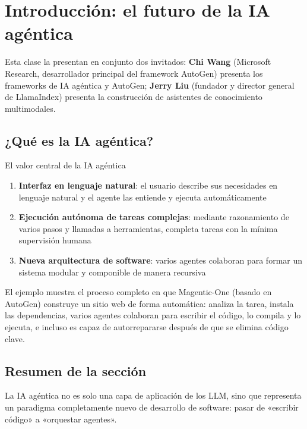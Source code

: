 \section{Introducción: el futuro de la IA agéntica}

Esta clase la presentan en conjunto dos invitados: \textbf{Chi Wang} (Microsoft Research, desarrollador principal del framework AutoGen) presenta los frameworks de IA agéntica y AutoGen; \textbf{Jerry Liu} (fundador y director general de LlamaIndex) presenta la construcción de asistentes de conocimiento multimodales.

\subsection{¿Qué es la IA agéntica?}

\begin{importantbox}{El valor central de la IA agéntica}
\begin{enumerate}
    \item \textbf{Interfaz en lenguaje natural}: el usuario describe sus necesidades en lenguaje natural y el agente las entiende y ejecuta automáticamente
    \item \textbf{Ejecución autónoma de tareas complejas}: mediante razonamiento de varios pasos y llamadas a herramientas, completa tareas con la mínima supervisión humana
    \item \textbf{Nueva arquitectura de software}: varios agentes colaboran para formar un sistema modular y componible de manera recursiva
\end{enumerate}
\end{importantbox}

El ejemplo muestra el proceso completo en que Magentic-One (basado en AutoGen) construye un sitio web de forma automática: analiza la tarea, instala las dependencias, varios agentes colaboran para escribir el código, lo compila y lo ejecuta, e incluso es capaz de autorrepararse después de que se elimina código clave.

\subsection{Resumen de la sección}

La IA agéntica no es solo una capa de aplicación de los LLM, sino que representa un paradigma completamente nuevo de desarrollo de software: pasar de «escribir código» a «orquestar agentes».

